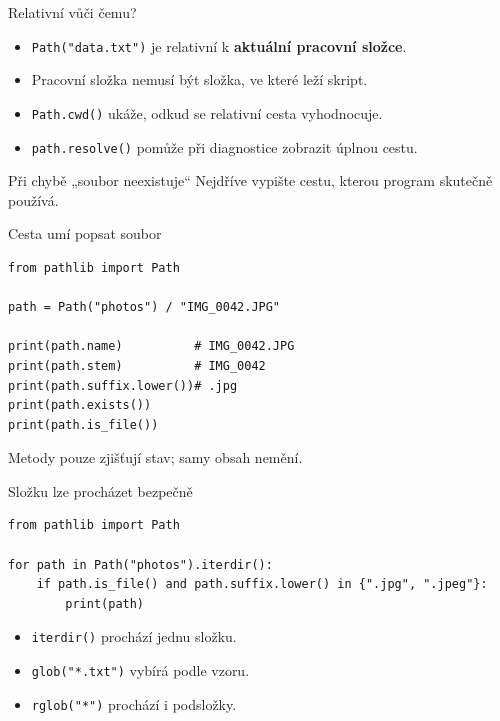 \documentclass[aspectratio=169]{beamer}
\newcommand{\term}[1]{\textcolor{CodeBlue}{\textbf{#1}}}
\begin{document}
\begin{frame}{Relativní vůči čemu?}
  \begin{itemize}
    \item \texttt{Path("data.txt")} je relativní k \term{aktuální pracovní složce}.
    \item Pracovní složka nemusí být složka, ve které leží skript.
    \item \texttt{Path.cwd()} ukáže, odkud se relativní cesta vyhodnocuje.
    \item \texttt{path.resolve()} pomůže při diagnostice zobrazit úplnou cestu.
  \end{itemize}
  \begin{block}{Při chybě „soubor neexistuje“}
    Nejdříve vypište cestu, kterou program skutečně používá.
  \end{block}
\end{frame}

\begin{frame}[fragile]{Cesta umí popsat soubor}
\begin{lstlisting}[style=pythonSmall]
from pathlib import Path

path = Path("photos") / "IMG_0042.JPG"

print(path.name)          # IMG_0042.JPG
print(path.stem)          # IMG_0042
print(path.suffix.lower())# .jpg
print(path.exists())
print(path.is_file())
\end{lstlisting}
  Metody pouze zjišťují stav; samy obsah nemění.
\end{frame}

\begin{frame}[fragile]{Složku lze procházet bezpečně}
\begin{lstlisting}[style=pythonSmall]
from pathlib import Path

for path in Path("photos").iterdir():
    if path.is_file() and path.suffix.lower() in {".jpg", ".jpeg"}:
        print(path)
\end{lstlisting}
  \begin{itemize}
    \item \texttt{iterdir()} prochází jednu složku.
    \item \texttt{glob("*.txt")} vybírá podle vzoru.
    \item \texttt{rglob("*")} prochází i podsložky.
  \end{itemize}
\end{frame}
\end{document}
